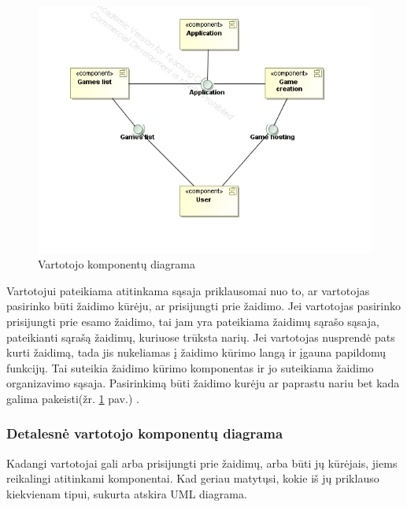 \documentclass{VUMIFPSkursinis}
\begin{document}
		\begin{figure}[H]
			\centering
			\includegraphics[scale=0.6]{img/UMLComponent2}
			\caption{Vartotojo komponentų diagrama}
			\label{img:UMLComponent2}
		\end{figure}
		Vartotojui pateikiama atitinkama sąsaja priklausomai nuo to, ar vartotojas pasirinko būti žaidimo kūrėju, ar prisijungti prie žaidimo. Jei vartotojas pasirinko prisijungti prie esamo žaidimo, tai jam yra pateikiama žaidimų sąrašo sąsaja, pateikianti sąrašą žaidimų, kuriuose trūksta narių. Jei vartotojas nusprendė pats kurti žaidimą, tada jis nukeliamas į žaidimo kūrimo langą ir įgauna papildomų funkcijų. Tai suteikia žaidimo kūrimo komponentas ir jo suteikiama žaidimo organizavimo sąsaja. Pasirinkimą būti žaidimo kurėju ar paprastu nariu bet kada galima pakeisti(žr. \ref{img:UMLComponent2} pav.) . 
		
		\subsubsection{Detalesnė vartotojo komponentų diagrama}
		Kadangi vartotojai gali arba prisijungti prie žaidimų, arba būti jų kūrėjais, jiems reikalingi atitinkami komponentai. Kad geriau matytųsi, kokie iš jų priklauso kiekvienam tipui, sukurta atskira UML diagrama.
		
\end{document}
